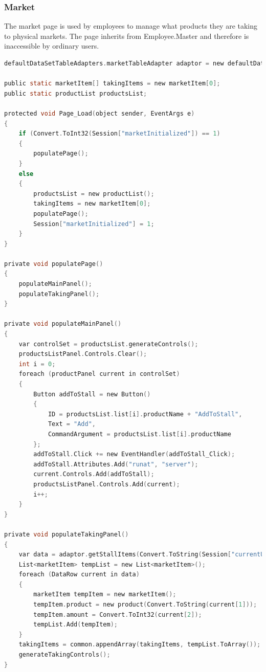 ﻿\documentclass{article}
\begin{document}
    \subsubsection{Market}
    The market page is used by employees to manage what products they are taking to physical markets.
    The page inherits from Employee.Master and therefore is inaccessible by ordinary users.
    \begin{lstlisting}[language=C]
defaultDataSetTableAdapters.marketTableAdapter adaptor = new defaultDataSetTableAdapters.marketTableAdapter();

public static marketItem[] takingItems = new marketItem[0];
public static productList productsList;

protected void Page_Load(object sender, EventArgs e)
{
    if (Convert.ToInt32(Session["marketInitialized"]) == 1)
    {
        populatePage();
    }
    else
    {
        productsList = new productList();
        takingItems = new marketItem[0];
        populatePage();
        Session["marketInitialized"] = 1;
    }
}

private void populatePage()
{
    populateMainPanel();
    populateTakingPanel();
}

private void populateMainPanel()
{
    var controlSet = productsList.generateControls();
    productsListPanel.Controls.Clear();
    int i = 0;
    foreach (productPanel current in controlSet)
    {
        Button addToStall = new Button()
        {
            ID = productsList.list[i].productName + "AddToStall",
            Text = "Add",
            CommandArgument = productsList.list[i].productName
        };
        addToStall.Click += new EventHandler(addToStall_Click);
        addToStall.Attributes.Add("runat", "server");
        current.Controls.Add(addToStall);
        productsListPanel.Controls.Add(current);
        i++;
    }
}

private void populateTakingPanel()
{
    var data = adaptor.getStallItems(Convert.ToString(Session["currentUser"]));
    List<marketItem> tempList = new List<marketItem>();
    foreach (DataRow current in data)
    {
        marketItem tempItem = new marketItem();
        tempItem.product = new product(Convert.ToString(current[1]));
        tempItem.amount = Convert.ToInt32(current[2]);
        tempList.Add(tempItem);
    }
    takingItems = common.appendArray(takingItems, tempList.ToArray());
    generateTakingControls();
}


\end{lstlisting}
\end{document}
